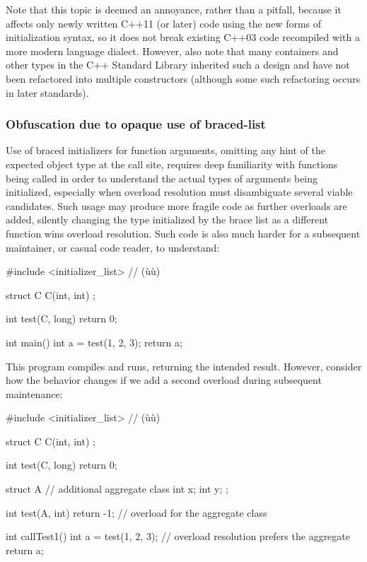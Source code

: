 \noindent Note that this topic is deemed an annoyance, rather than a pitfall,
because it affects only newly written C++11 (or later) code using the
new forms of initialization syntax, so it does not break existing C++03
code recompiled with a more modern language dialect. However, also note
that many containers and other types in the C++ Standard Library
inherited such a design and have not been refactored into multiple
constructors (although some such refactoring occurs in later standards).

\subsubsection[Obfuscation due to opaque use of braced-list]{Obfuscation due to opaque use of braced-list}\label{obfuscation-due-to-opaque-use-of-braced-list}

Use of braced initializers for function arguments, omitting any hint of
the expected object type at the call site, requires deep familiarity
with functions being called in order to understand the actual types of
arguments being initialized, especially when overload resolution must
disambiguate several viable candidates. Such usage may produce more
fragile code as further overloads are added, silently changing the type
initialized by the brace list as a different function wins overload
resolution. Such code is also much harder for a subsequent maintainer,
or casual code reader, to understand:

\begin{emcppslisting}
#include <initializer_list>  // (ù{}ù)

struct C
{
    C(int, int) { }
};

int test(C, long) { return 0; }

int main()
{
    int a = test({1, 2}, 3);
    return a;
}
\end{emcppslisting}
    

\noindent This program compiles and runs, returning the intended result. However,
consider how the behavior changes if we add a second overload during
subsequent maintenance:

\begin{emcppslisting}[emcppsbatch=e23]
#include <initializer_list>  // (ù{}ù)

struct C
{
    C(int, int) { }
};

int test(C, long) { return 0; }

struct A  // additional aggregate class
{
    int x;
    int y;
};

int test(A, int) { return -1; }  // overload for the aggregate class

int callTest1()
{
    int a = test({1, 2}, 3);     // overload resolution prefers the aggregate
    return a;
}
\end{emcppslisting}
    

